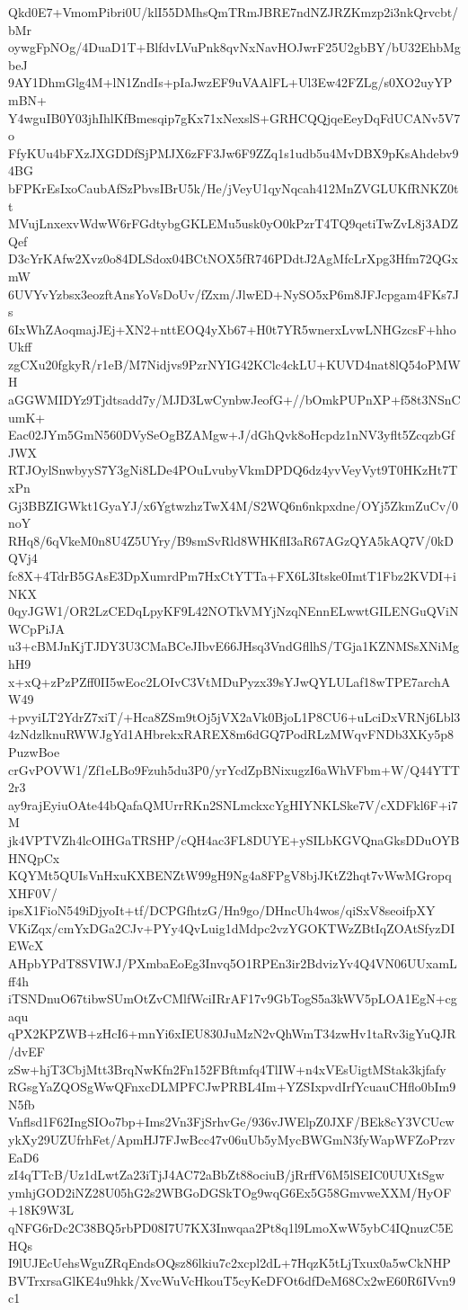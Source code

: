 Qkd0E7+VmomPibri0U/klI55DMhsQmTRmJBRE7ndNZJRZKmzp2i3nkQrvcbt/bMr
oywgFpNOg/4DuaD1T+BlfdvLVuPnk8qvNxNavHOJwrF25U2gbBY/bU32EhbMgbeJ
9AY1DhmGlg4M+lN1ZndIs+pIaJwzEF9uVAAlFL+Ul3Ew42FZLg/s0XO2uyYPmBN+
Y4wguIB0Y03jhIhlKfBmesqip7gKx71xNexslS+GRHCQQjqeEeyDqFdUCANv5V7o
FfyKUu4bFXzJXGDDfSjPMJX6zFF3Jw6F9ZZq1s1udb5u4MvDBX9pKsAhdebv94BG
bFPKrEsIxoCaubAfSzPbvsIBrU5k/He/jVeyU1qyNqcah412MnZVGLUKfRNKZ0tt
MVujLnxexvWdwW6rFGdtybgGKLEMu5usk0yO0kPzrT4TQ9qetiTwZvL8j3ADZQef
D3cYrKAfw2Xvz0o84DLSdox04BCtNOX5fR746PDdtJ2AgMfcLrXpg3Hfm72QGxmW
6UVYvYzbsx3eozftAnsYoVsDoUv/fZxm/JlwED+NySO5xP6m8JFJcpgam4FKs7Js
6IxWhZAoqmajJEj+XN2+nttEOQ4yXb67+H0t7YR5wnerxLvwLNHGzcsF+hhoUkff
zgCXu20fgkyR/r1eB/M7Nidjvs9PzrNYIG42KClc4ckLU+KUVD4nat8lQ54oPMWH
aGGWMIDYz9Tjdtsadd7y/MJD3LwCynbwJeofG+//bOmkPUPnXP+f58t3NSnCumK+
Eac02JYm5GmN560DVySeOgBZAMgw+J/dGhQvk8oHcpdz1nNV3yflt5ZcqzbGfJWX
RTJOylSnwbyyS7Y3gNi8LDe4POuLvubyVkmDPDQ6dz4yvVeyVyt9T0HKzHt7TxPn
Gj3BBZIGWkt1GyaYJ/x6YgtwzhzTwX4M/S2WQ6n6nkpxdne/OYj5ZkmZuCv/0noY
RHq8/6qVkeM0n8U4Z5UYry/B9smSvRld8WHKflI3aR67AGzQYA5kAQ7V/0kDQVj4
fc8X+4TdrB5GAsE3DpXumrdPm7HxCtYTTa+FX6L3Itske0ImtT1Fbz2KVDI+iNKX
0qyJGW1/OR2LzCEDqLpyKF9L42NOTkVMYjNzqNEnnELwwtGILENGuQViNWCpPiJA
u3+cBMJnKjTJDY3U3CMaBCeJIbvE66JHsq3VndGfllhS/TGja1KZNMSsXNiMghH9
x+xQ+zPzPZff0II5wEoc2LOIvC3VtMDuPyzx39sYJwQYLULaf18wTPE7archAW49
+pvyiLT2YdrZ7xiT/+Hca8ZSm9tOj5jVX2aVk0BjoL1P8CU6+uLciDxVRNj6Lbl3
4zNdzlknuRWWJgYd1AHbrekxRAREX8m6dGQ7PodRLzMWqvFNDb3XKy5p8PuzwBoe
crGvPOVW1/Zf1eLBo9Fzuh5du3P0/yrYcdZpBNixugzI6aWhVFbm+W/Q44YTT2r3
ay9rajEyiuOAte44bQafaQMUrrRKn2SNLmckxcYgHIYNKLSke7V/cXDFkl6F+i7M
jk4VPTVZh4lcOIHGaTRSHP/cQH4ac3FL8DUYE+ySILbKGVQnaGksDDuOYBHNQpCx
KQYMt5QUIsVnHxuKXBENZtW99gH9Ng4a8FPgV8bjJKtZ2hqt7vWwMGropqXHF0V/
ipsX1FioN549iDjyoIt+tf/DCPGfhtzG/Hn9go/DHncUh4wos/qiSxV8seoifpXY
VKiZqx/cmYxDGa2CJv+PYy4QvLuig1dMdpc2vzYGOKTWzZBtIqZOAtSfyzDIEWcX
AHpbYPdT8SVIWJ/PXmbaEoEg3Invq5O1RPEn3ir2BdvizYv4Q4VN06UUxamLff4h
iTSNDnuO67tibwSUmOtZvCMlfWciIRrAF17v9GbTogS5a3kWV5pLOA1EgN+cgaqu
qPX2KPZWB+zHcI6+mnYi6xIEU830JuMzN2vQhWmT34zwHv1taRv3igYuQJR/dvEF
zSw+hjT3CbjMtt3BrqNwKfn2Fn152FBftmfq4TlIW+n4xVEsUigtMStak3kjfafy
RGsgYaZQOSgWwQFnxcDLMPFCJwPRBL4Im+YZSIxpvdIrfYcuauCHflo0bIm9N5fb
Vnflsd1F62IngSIOo7bp+Ims2Vn3FjSrhvGe/936vJWElpZ0JXF/BEk8cY3VCUcw
ykXy29UZUfrhFet/ApmHJ7FJwBcc47v06uUb5yMycBWGmN3fyWapWFZoPrzvEaD6
zI4qTTcB/Uz1dLwtZa23iTjJ4AC72aBbZt88ociuB/jRrffV6M5lSEIC0UUXtSgw
ymhjGOD2iNZ28U05hG2s2WBGoDGSkTOg9wqG6Ex5G58GmvweXXM/HyOF+18K9W3L
qNFG6rDc2C38BQ5rbPD08I7U7KX3Inwqaa2Pt8q1l9LmoXwW5ybC4IQnuzC5EHQs
I9lUJEcUehsWguZRqEndsOQsz86lkiu7c2xcpl2dL+7HqzK5tLjTxux0a5wCkNHP
BVTrxrsaGlKE4u9hkk/XvcWuVcHkouT5cyKeDFOt6dfDeM68Cx2wE60R6IVvn9c1
